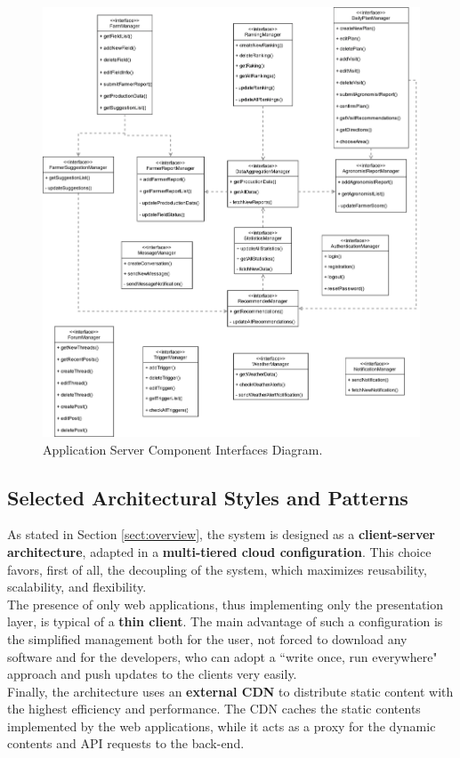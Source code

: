 \begin{figure}[H]
\centering
\includegraphics[width=\textwidth]{../images_diagrams/dd/component_interfaces_diagram.png}
\caption{Application Server Component Interfaces Diagram.}
\label{fig:componentInterface}
\end{figure}

\subsection{Selected Architectural Styles and Patterns}
\noindent
As stated in Section \ref{sect:overview}, the system is designed as a \textbf{client-server architecture}, adapted in a \textbf{multi-tiered cloud configuration}. This choice favors, first of all, the decoupling of the system, which maximizes reusability, scalability, and flexibility.\smallskip \\
The presence of only web applications, thus implementing only the presentation layer, is typical of a \textbf{thin client}. The main advantage of such a configuration is the simplified management both for the user, not forced to download any software and for the developers, who can adopt a “write once, run everywhere" approach and push updates to the clients very easily.\smallskip \\
Finally, the architecture uses an \textbf{external CDN} to distribute static content with the highest efficiency and performance. The CDN caches the static contents implemented by the web applications, while it acts as a proxy for the dynamic contents and API requests to the back-end.\\

